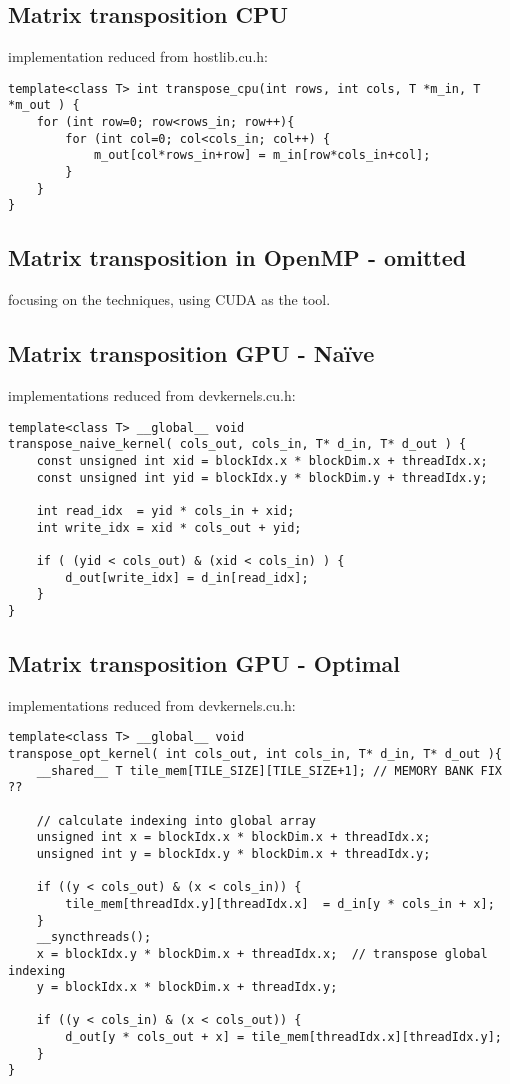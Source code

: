 \documentclass[a4paper,10pt]{article}
\begin{document}
\subsection{Matrix transposition CPU} implementation reduced from hostlib.cu.h:
\begin{verbatim}
template<class T> int transpose_cpu(int rows, int cols, T *m_in, T *m_out ) {
    for (int row=0; row<rows_in; row++){
        for (int col=0; col<cols_in; col++) {
            m_out[col*rows_in+row] = m_in[row*cols_in+col];
        }
    }
}
\end{verbatim}

\vfill

\subsection{Matrix transposition in OpenMP - omitted}
focusing on the techniques, using CUDA as the tool.

\vfill

\subsection{Matrix transposition GPU - Naïve} implementations reduced from devkernels.cu.h:
\begin{verbatim}
template<class T> __global__ void
transpose_naive_kernel( cols_out, cols_in, T* d_in, T* d_out ) {
    const unsigned int xid = blockIdx.x * blockDim.x + threadIdx.x;
    const unsigned int yid = blockIdx.y * blockDim.y + threadIdx.y;

    int read_idx  = yid * cols_in + xid;
    int write_idx = xid * cols_out + yid;
 
    if ( (yid < cols_out) & (xid < cols_in) ) {
        d_out[write_idx] = d_in[read_idx];
    }
}
\end{verbatim}

\vfill

\subsection{Matrix transposition GPU - Optimal} implementations reduced from devkernels.cu.h:
\begin{verbatim}
template<class T> __global__ void
transpose_opt_kernel( int cols_out, int cols_in, T* d_in, T* d_out ){
    __shared__ T tile_mem[TILE_SIZE][TILE_SIZE+1]; // MEMORY BANK FIX ??
 
    // calculate indexing into global array
    unsigned int x = blockIdx.x * blockDim.x + threadIdx.x;
    unsigned int y = blockIdx.y * blockDim.x + threadIdx.y;

    if ((y < cols_out) & (x < cols_in)) {
        tile_mem[threadIdx.y][threadIdx.x]  = d_in[y * cols_in + x];
    }
    __syncthreads();
    x = blockIdx.y * blockDim.x + threadIdx.x;  // transpose global indexing
    y = blockIdx.x * blockDim.x + threadIdx.y;

    if ((y < cols_in) & (x < cols_out)) {
        d_out[y * cols_out + x] = tile_mem[threadIdx.x][threadIdx.y];
    }
}
\end{verbatim}
\vfill
\end{document}

